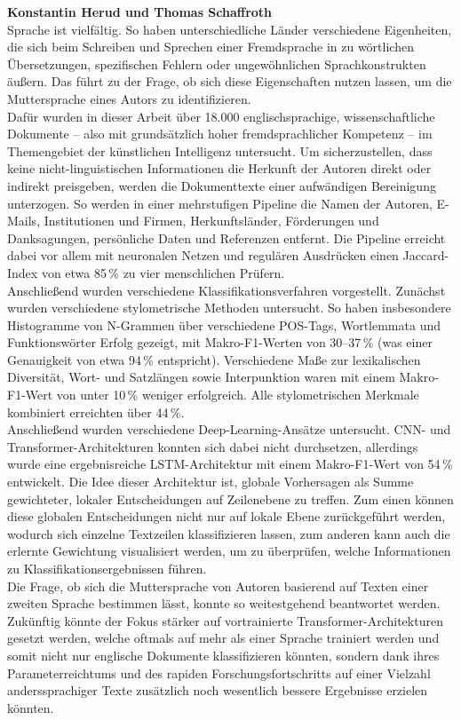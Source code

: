 \documentclass[bachelor,german]{info1thesis}
\begin{document}
\textbf{Konstantin Herud und Thomas Schaffroth} \\
Sprache ist vielfältig. So haben unterschiedliche Länder verschiedene Eigenheiten, die sich beim Schreiben und Sprechen einer Fremdsprache in zu wörtlichen Übersetzungen, spezifischen Fehlern oder ungewöhnlichen Sprachkonstrukten äußern. Das führt zu der Frage, ob sich diese Eigenschaften nutzen lassen, um die Muttersprache eines Autors zu identifizieren. \\
Dafür wurden in dieser Arbeit über 18.000 englischsprachige, wissenschaftliche Dokumente -- also mit grundsätzlich hoher fremdsprachlicher Kompetenz -- im Themengebiet der künstlichen Intelligenz untersucht.
Um sicherzustellen, dass keine nicht-linguistischen Informationen die Herkunft der Autoren direkt oder indirekt preisgeben, werden die Dokumenttexte einer aufwändigen Bereinigung unterzogen. So werden in einer mehrstufigen Pipeline die Namen der Autoren, E-Mails, Institutionen und Firmen, Herkunftsländer, Förderungen und Danksagungen, persönliche Daten und Referenzen entfernt. Die Pipeline erreicht dabei vor allem mit neuronalen Netzen und regulären Ausdrücken einen Jaccard-Index von etwa 85\,\% zu vier menschlichen Prüfern. \\
Anschließend wurden verschiedene Klassifikationsverfahren vorgestellt. Zunächst wurden verschiedene stylometrische Methoden untersucht. So haben insbesondere Histogramme von N-Grammen über verschiedene POS-Tags, Wortlemmata und Funktionswörter Erfolg gezeigt, mit Makro-F1-Werten von 30--37\,\% (was einer Genauigkeit von etwa 94\,\% entspricht). Verschiedene Maße zur lexikalischen Diversität, Wort- und Satzlängen sowie Interpunktion waren mit einem Makro-F1-Wert von unter 10\,\% weniger erfolgreich. Alle stylometrischen Merkmale kombiniert erreichten über 44\,\%. \\
Anschließend wurden verschiedene Deep-Learning-Ansätze untersucht. CNN- und Trans\-former-Architekturen konnten sich dabei nicht durchsetzen, allerdings wurde eine ergebnisreiche LSTM-Architektur mit einem Makro-F1-Wert von 54\,\% entwickelt. Die Idee dieser Architektur ist, globale Vorhersagen als Summe gewichteter, lokaler Entscheidungen auf Zeilenebene zu treffen. Zum einen können diese globalen Entscheidungen nicht nur auf lokale Ebene zurückgeführt werden, wodurch sich einzelne Textzeilen klassifizieren lassen, zum anderen kann auch die erlernte Gewichtung visualisiert werden, um zu überprüfen, welche Informationen zu Klassifikationsergebnissen führen. \\
Die Frage, ob sich die Muttersprache von Autoren basierend auf Texten einer zweiten Sprache bestimmen lässt, konnte so weitestgehend beantwortet werden. \\
Zukünftig könnte der Fokus stärker auf vortrainierte Transformer-Architekturen gesetzt werden, welche oftmals auf mehr als einer Sprache trainiert werden und somit nicht nur englische Dokumente klassifizieren könnten, sondern dank ihres Parameterreichtums und des rapiden Forschungsfortschritts auf einer Vielzahl anderssprachiger Texte zusätzlich noch wesentlich bessere Ergebnisse erzielen könnten.
\end{document}
